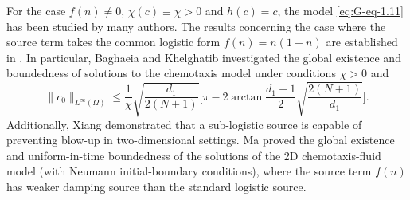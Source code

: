 \documentclass[10pt,a4paper]{amsart}
\numberwithin{equation}{section}
\begin{document}
For the case $ f(n) \neq 0 $, $ \chi(c)\equiv\chi >0 $ and $ h(c) = c $, 
the model \eqref{eq:G-eq-1.11} has been studied by many authors. The results
concerning the case where the source term takes the common logistic form 
$ f(n) = n(1 - n) $ are established in \cite{ma-2,ma-14,ma-24}. In
particular, Baghaeia and Khelghatib \cite{ma-2} investigated the global existence and 
boundedness of solutions to the chemotaxis model under conditions 
$ \chi > 0$ and 
\[
 \|c_{0}\|_{L^{\infty}(\Omega)}
 \leq \frac{1}{\chi} \sqrt{\frac{d_1}{2(N+1)}} \Big[ \pi - 2\arctan \frac{d_1-1}{2}
\sqrt{\frac{2(N+1)}{d_1}}\Big].
\]
 Additionally, Xiang \cite{Xiang2018-2} demonstrated that a
sub-logistic source is capable of preventing blow-up in two-dimensional settings. 
Ma \cite{ma} proved the global existence and uniform-in-time boundedness of the 
solutions of the 2D chemotaxis-fluid model (with Neumann initial-boundary conditions), 
where the source term $f(n)$ has weaker damping source than
the standard logistic source.
\end{document}
